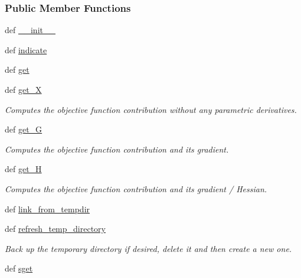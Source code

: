 \subsubsection*{Public Member Functions}
\begin{DoxyCompactItemize}
\item 
def \hyperlink{classforcebalance_1_1binding_1_1BindingEnergy_a0896e853f40719dc6e1c4574adbbb152}{\-\_\-\-\_\-init\-\_\-\-\_\-}
\item 
def \hyperlink{classforcebalance_1_1binding_1_1BindingEnergy_a12deb881863b64276bf847a949a36845}{indicate}
\item 
def \hyperlink{classforcebalance_1_1binding_1_1BindingEnergy_a263fadef13141ef341a01d1f538f85af}{get}
\item 
def \hyperlink{classforcebalance_1_1target_1_1Target_a606dd136f195c267c05a2455405e5949}{get\-\_\-\-X}
\begin{DoxyCompactList}\small\item\em Computes the objective function contribution without any parametric derivatives. \end{DoxyCompactList}\item 
def \hyperlink{classforcebalance_1_1target_1_1Target_afa8cc38c8bba8861c072e789717aa049}{get\-\_\-\-G}
\begin{DoxyCompactList}\small\item\em Computes the objective function contribution and its gradient. \end{DoxyCompactList}\item 
def \hyperlink{classforcebalance_1_1target_1_1Target_a1d2ee27fe86a09769c1816af23b09adb}{get\-\_\-\-H}
\begin{DoxyCompactList}\small\item\em Computes the objective function contribution and its gradient / Hessian. \end{DoxyCompactList}\item 
def \hyperlink{classforcebalance_1_1target_1_1Target_a5aa4958cea0a48138511567a076c5a82}{link\-\_\-from\-\_\-tempdir}
\item 
def \hyperlink{classforcebalance_1_1target_1_1Target_afe815eafab06ac92f10bbf4b88ad95c8}{refresh\-\_\-temp\-\_\-directory}
\begin{DoxyCompactList}\small\item\em Back up the temporary directory if desired, delete it and then create a new one. \end{DoxyCompactList}\item 
def \hyperlink{classforcebalance_1_1target_1_1Target_a51d58b55242bf4d4909c1837174f5f3c}{sget}

\end{DoxyCompactItemize}
